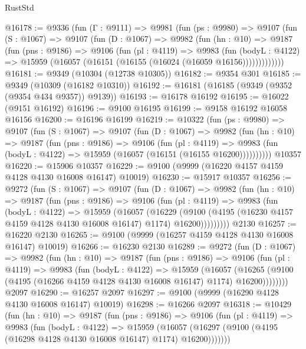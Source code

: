 \begin{lexlean}{RustStd}
\begin{coremodule}
@16178 := @9336
    (fun (Γ : @9111) =>
    @9981
      (fun (ps : @9980) =>
      @9107
        (fun (S : @1067) =>
        @9107
          (fun (D : @1067) =>
          @9982
            (fun (hn : @10) =>
            @9187
              (fun (pns : @9186) =>
              @9106
                (fun (pl : @4119) =>
                @9983
                  (fun (bodyL : @4122) =>
                  @15959 (@16057 (@16151 (@16155 (@16024 (@16059 @16156)))))))))))))
@16181 := @9349 (@10304 (@12738 @10305))
@16182 := @9354 @301
@16185 := @9349 (@10309 (@16182 @10310))
@16192 := @16181 (@16185 (@9349 (@9352 (@9354 @434 @9357)) @9139))
@16193 := @16178 @16192
@16195 := @16022 (@9151 @16192)
@16196 := @9100 @16195
@16199 := @9158 @16192 @16058 @16156
@16200 := @16196 @16199
@16219 := @10322
    (fun (ps : @9980) =>
    @9107
      (fun (S : @1067) =>
      @9107
        (fun (D : @1067) =>
        @9982
          (fun (hn : @10) =>
          @9187
            (fun (pns : @9186) =>
            @9106
              (fun (pl : @4119) =>
              @9983 (fun (bodyL : @4122) => @15959 (@16057 (@16151 (@16155 @16200))))))))))
    @10357
@16220 := @15906 @10357
@16229 := @9100 (@9999 (@16220 @4157 @4159 @4128 @4130 @16008 @16147) @10019)
@16230 := @15917 @10357
@16256 := @9272
    (fun (S : @1067) =>
    @9107
      (fun (D : @1067) =>
      @9982
        (fun (hn : @10) =>
        @9187
          (fun (pns : @9186) =>
          @9106
            (fun (pl : @4119) =>
            @9983
              (fun (bodyL : @4122) =>
              @15959
                (@16057
                  (@16229
                    (@9100
                      (@4195 (@16230 @4157 @4159 @4128 @4130 @16008 @16147) @1174)
                      @16200)))))))))
    @2130
@16257 := @16220 @2130
@16265 := @9100 (@9999 (@16257 @4159 @4128 @4130 @16008 @16147) @10019)
@16266 := @16230 @2130
@16289 := @9272
    (fun (D : @1067) =>
    @9982
      (fun (hn : @10) =>
      @9187
        (fun (pns : @9186) =>
        @9106
          (fun (pl : @4119) =>
          @9983
            (fun (bodyL : @4122) =>
            @15959
              (@16057
                (@16265 (@9100 (@4195 (@16266 @4159 @4128 @4130 @16008 @16147) @1174) @16200))))))))
    @2097
@16290 := @16257 @2097
@16297 := @9100 (@9999 (@16290 @4128 @4130 @16008 @16147) @10019)
@16298 := @16266 @2097
@16318 := @10429
    (fun (hn : @10) =>
    @9187
      (fun (pns : @9186) =>
      @9106
        (fun (pl : @4119) =>
        @9983
          (fun (bodyL : @4122) =>
          @15959
            (@16057 (@16297 (@9100 (@4195 (@16298 @4128 @4130 @16008 @16147) @1174) @16200)))))))

\end{coremodule}
\end{lexlean}
